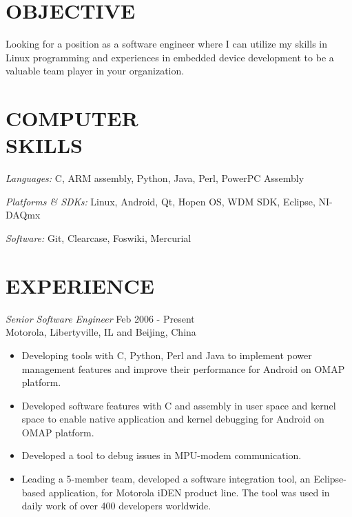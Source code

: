 \documentclass[line,margin]{res}
\begin{document}
\address{111 South Busey Avenue Apt 5, Urbana, IL 61801}
\address{(217)898-3636\\
  pengliu2@illinois.edu}
 
\begin{resume}
 
\section{OBJECTIVE} Looking for a position as a software engineer where I can utilize my skills in Linux programming and experiences in embedded device development to be a valuable team player in your organization. 
 
\section{COMPUTER \\ SKILLS} {\sl Languages:} C, ARM assembly, Python, Java, Perl, PowerPC Assembly

                {\sl Platforms \& SDKs:} Linux, Android, Qt, Hopen OS, WDM SDK, Eclipse, NI-DAQmx
                
                {\sl Software:} Git, Clearcase, Foswiki, Mercurial
 
                \section{EXPERIENCE} {\sl Senior Software Engineer} \hfill Feb 2006 - Present \\
                Motorola, Libertyville, IL and Beijing, China

                \begin{itemize}  %
                \item Developing tools with C, Python, Perl and Java to implement power management
                  features and improve their performance for Android on OMAP platform.
                \item Developed software features with C and assembly in user space and kernel space
                  to enable native application and kernel debugging for Android on OMAP platform.
                \item Developed a tool to debug issues in MPU-modem communication.
                \item Leading a 5-member team, developed a software integration tool, 
                  an Eclipse-based application, for Motorola iDEN product line. The tool 
                  was used in daily work of over 400 developers worldwide.
                \end{itemize}
 

\end{resume}
\end{document}
